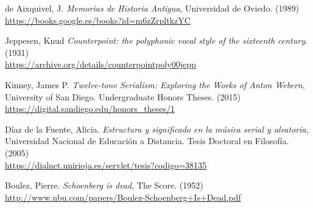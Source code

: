 \renewcommand\refname{Referencias}
	\begin{thebibliography}{00}
			
			
			{ de Aixquivel, J.} 
			\textit{Memorias de Historia Antigua},
			Universidad de Oviedo.
			(1989)
			\\\url{https://books.google.es/books?id=m6zZrpltkzYC}
			
			{ Jeppesen, Knud} 
			\textit{Counterpoint: the polyphonic vocal style of the sixteenth century}.
			(1931)
			\\\url{https://archive.org/details/counterpointpoly00jepp}
			
			{ Kinney, James P.} 
			\textit{Twelve-tone Serialism: Exploring the Works of Anton Webern},
			University of San Diego.
			Undergraduate Honors Theses.
			(2015)
			\\\url{https://digital.sandiego.edu/honors_theses/1}
			
			{ D\'iaz de la Fuente, Alicia.} 
			\textit{Estructura y significado en la m\'usica serial y aleatoria},
			Universidad Nacional de Educaci\'on a Distancia.
			Tesis Doctoral en Filosof\'ia.
			(2005)
			\\\url{https://dialnet.unirioja.es/servlet/tesis?codigo=38135}		
			
			
			
			{ Boulez, Pierre.}
			\textit{Schoenberg is dead},
			The Score.
			(1952)
			\\\url{http://www.ubu.com/papers/Boulez-Schoenberg+Is+Dead.pdf}
			

\end{thebibliography}
